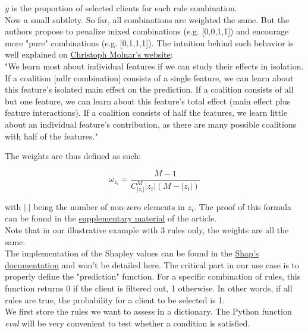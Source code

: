 $y$ is the proportion of selected clients for each rule combination. \\

Now a small subtlety. So far, all combinations are weighted the same. But the authors propose to penalize mixed combinations (e.g. [0,0,1,1]) and encourage more "pure" combinations (e.g. [0,1,1,1]). The intuition behind such behavior is well explained on \href{https://christophm.github.io/interpretable-ml-book/shapley.html}{Christoph Molnar’s website}: \\

"We learn most about individual features if we can study their effects in isolation. If a coalition [ndlr combination] consists of a single feature, we can learn about this feature’s isolated main effect on the prediction. If a coalition consists of all but one feature, we can learn about this feature’s total effect (main effect plus feature interactions). If a coalition consists of half the features, we learn little about an individual feature’s contribution, as there are many possible coalitions with half of the features."

The weights are thus defined as such:

$$\omega_{z_i} = \frac{M-1}{C_{|z_i|}^M |z_i|(M-|z_i|)}$$

with $|.|$ being the number of non-zero elements in $z_i$. The proof of this formula can be found in the \href{https://proceedings.neurips.cc/paper/2017/hash/8a20a8621978632d76c43dfd28b67767-Abstract.html}{supplementary material} of the article. \\

Note that in our illustrative example with 3 rules only, the weights are all the same. \\

The implementation of the Shapley values can be found in the \href{https://shap.readthedocs.io/en/latest/example_notebooks/tabular_examples/model_agnostic/Simple%20Kernel%20SHAP.html}{Shap's documentation} and won't be detailed here. The critical part in our use case is to properly define the "prediction" function. For a specific combination of rules, this function returns $0$ if the client is filtered out, 1 otherwise. In other words, if all rules are true, the probability for a client to be selected is 1. \\

We first store the rules we want to assess in a dictionary. The Python function \textit{eval} will be very convenient to test whether a condition is satisfied.

